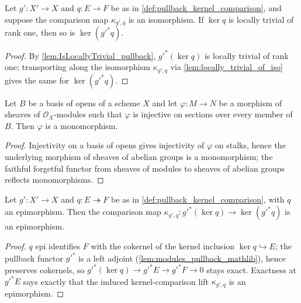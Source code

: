 \begin{lemma}\leanok
  \label{lem:pullback_kernel_isLocallyTrivial_of_isIso_kernelComparison}
  Let \(g' : X' \to X\) and \(q : E \to F\) be as in
  \cref{def:pullback_kernel_comparison}, and suppose the comparison map
  \(\kappa_{g',q}\) is an isomorphism. If \(\ker q\) is locally trivial of
  rank one, then so is \(\ker(g'^{*} q)\).
\end{lemma}
\begin{proof}\leanok
  By \cref{lem:IsLocallyTrivial_pullback}, \(g'^{*}(\ker q)\) is locally
  trivial of rank one; transporting along the isomorphism \(\kappa_{g',q}\)
  via \cref{lem:locally_trivial_of_iso} gives the same for
  \(\ker(g'^{*} q)\).
\end{proof}

\begin{lemma}\leanok
  \label{lem:modules_mono_of_injective_app_of_isBasis}
  Let \(B\) be a basis of opens of a scheme \(X\) and let
  \(\varphi : M \to N\) be a morphism of sheaves of \(\mathcal O_X\)-modules
  such that \(\varphi\) is injective on sections over every member of \(B\).
  Then \(\varphi\) is a monomorphism.
\end{lemma}
\begin{proof}\leanok
  Injectivity on a basis of opens gives injectivity of \(\varphi\) on
  stalks, hence the underlying morphism of sheaves of abelian groups is a
  monomorphism; the faithful forgetful functor from sheaves of modules to
  sheaves of abelian groups reflects monomorphisms.
\end{proof}

\begin{lemma}\leanok
  \label{lem:pullback_kernel_comparison_epi}
  Let \(g' : X' \to X\) and \(q : E \twoheadrightarrow F\) be as in
  \cref{def:pullback_kernel_comparison}, with \(q\) an epimorphism. Then the
  comparison map \(\kappa_{g',q} : g'^{*}(\ker q) \to \ker(g'^{*} q)\) is an
  epimorphism.
\end{lemma}
\begin{proof}\leanok
  \(q\) epi identifies \(F\) with the cokernel of the kernel inclusion
  \(\ker q \hookrightarrow E\); the pullback functor \(g'^{*}\) is a left
  adjoint (\cref{lem:modules_pullback_mathlib}), hence preserves cokernels,
  so \(g'^{*}(\ker q) \to g'^{*}E \to g'^{*}F \to 0\) stays exact. Exactness
  at \(g'^{*}E\) says exactly that the induced kernel-comparison lift
  \(\kappa_{g',q}\) is an epimorphism.
\end{proof}

